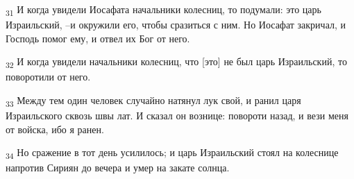 \begin{tcolorbox}
\textsubscript{31} И когда увидели Иосафата начальники колесниц, то подумали: это царь Израильский, --и окружили его, чтобы сразиться с ним. Но Иосафат закричал, и Господь помог ему, и отвел их Бог от него.
\end{tcolorbox}
\begin{tcolorbox}
\textsubscript{32} И когда увидели начальники колесниц, что [это] не был царь Израильский, то поворотили от него.
\end{tcolorbox}
\begin{tcolorbox}
\textsubscript{33} Между тем один человек случайно натянул лук свой, и ранил царя Израильского сквозь швы лат. И сказал он вознице: повороти назад, и вези меня от войска, ибо я ранен.
\end{tcolorbox}
\begin{tcolorbox}
\textsubscript{34} Но сражение в тот день усилилось; и царь Израильский стоял на колеснице напротив Сириян до вечера и умер на закате солнца.
\end{tcolorbox}
